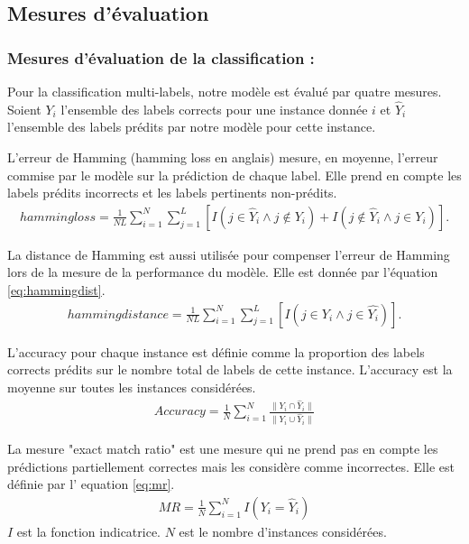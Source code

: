 \subsection{Mesures d'évaluation}

\subsubsection{Mesures d'évaluation de la classification :}
\qquad Pour la classification multi-labels, notre modèle est évalué par quatre mesures.\\
Soient $Y_i$ l'ensemble des labels corrects pour une instance donnée $i$ et $\hat{Y}_i$ l'ensemble des labels prédits par notre modèle pour cette instance.

L'erreur de Hamming (hamming loss en anglais) mesure, en moyenne, l'erreur commise par le modèle sur la prédiction de chaque label. Elle prend en compte les labels prédits incorrects et les labels pertinents non-prédits.
\begin{eqnarray}
hamming loss = \frac{1}{NL} \sum_{i=1}^{N} \sum_{j=1}^{L} [I(j \in \hat{Y}_{i} \wedge j \notin Y_{i} ) + I(j \notin \hat{Y}_{i} \wedge j \in Y_{i} )].
\end{eqnarray}

La distance de Hamming est aussi utilisée pour compenser l'erreur de Hamming lors de la mesure de la performance du modèle. Elle est donnée par l'équation \ref{eq:hammingdist}.
\begin{eqnarray}
hamming distance = \frac{1}{NL} \sum_{i=1}^{N} \sum_{j=1}^{L} [I(j \in {Y}_{i} \wedge j \in \hat{Y_{i}} )].
\label{eq:hammingdist}
\end{eqnarray}

L'accuracy pour chaque instance est définie comme la proportion des labels corrects prédits sur le nombre total de labels de cette instance. L'accuracy est la moyenne sur toutes les instances considérées.
\begin{eqnarray}
Accuracy = \frac{1}{N} \sum_{i=1}^N \frac{\|Y_i \cap \hat{Y}_i\|}{\|Y_i \cup \hat{Y}_i\|}
\end{eqnarray}

La mesure "exact match ratio" est une mesure qui ne prend pas en compte les prédictions partiellement correctes mais les considère comme incorrectes. Elle est définie par l' equation \ref{eq:mr}.
\begin{eqnarray}
MR = \frac{1}{N} \sum_{i=1}^{N}I(Y_i = \hat{Y}_i)
\label{eq:mr}
\end{eqnarray}
$I$ est la fonction indicatrice.
$N$ est le nombre d'instances considérées.

